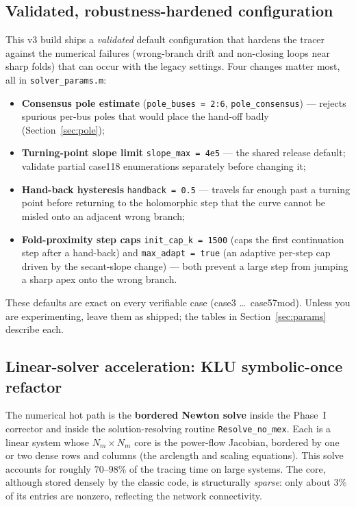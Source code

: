 \documentclass[11pt,a4paper]{article}
\newcommand{\code}[1]{\texttt{#1}}
\begin{document}
\subsection{Validated, robustness-hardened configuration}\label{sec:tuned}
This v3 build ships a \emph{validated} default configuration that hardens the tracer
against the numerical failures (wrong-branch drift and non-closing loops near sharp folds)
that can occur with the legacy settings. Four changes matter most, all in
\code{solver_params.m}:
\begin{itemize}[leftmargin=1.4em]
  \item \textbf{Consensus pole estimate} (\code{pole_buses = 2:6}, \code{pole_consensus})
        --- rejects spurious per-bus poles that would place the hand-off badly
        (Section~\ref{sec:pole});
  \item \textbf{Turning-point slope limit} \code{slope_max = 4e5} --- the shared
        release default; validate partial case118 enumerations separately before changing it;
  \item \textbf{Hand-back hysteresis} \code{handback = 0.5} --- travels far enough past a
        turning point before returning to the holomorphic step that the curve cannot be
        misled onto an adjacent wrong branch;
  \item \textbf{Fold-proximity step caps} \code{init_cap_k = 1500} (caps the first
        continuation step after a hand-back) and \code{max_adapt = true} (an adaptive
        per-step cap driven by the secant-slope change) --- both prevent a large step from
        jumping a sharp apex onto the wrong branch.
\end{itemize}
These defaults are exact on every verifiable case (case3 \dots\ case57mod). Unless you are
experimenting, leave them as shipped; the tables in Section~\ref{sec:params} describe each.

\subsection{Linear-solver acceleration: KLU symbolic-once refactor}\label{sec:klu}
The numerical hot path is the \textbf{bordered Newton solve} inside the Phase~I corrector
and inside the solution-resolving routine \code{Resolve_no_mex}. Each is a linear system
whose $N_m\times N_m$ core is the power-flow Jacobian, bordered by one or two dense rows and
columns (the arclength and scaling equations). This solve accounts for roughly
$70$--$98\%$ of the tracing time on large systems. The core, although stored densely by the
classic code, is structurally \emph{sparse}: only about $3\%$ of its entries are nonzero,
reflecting the network connectivity.
\end{document}
